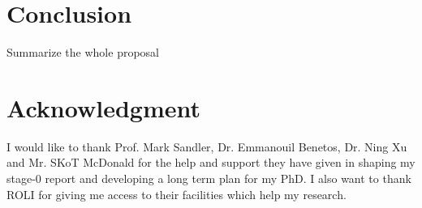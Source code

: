 \documentclass[journal,onecolumn]{IEEEtran}
\begin{document}




\section{Conclusion}
Summarize the whole proposal






%



\section*{Acknowledgment}
I would like to thank Prof. Mark Sandler, Dr. Emmanouil Benetos, Dr. Ning Xu and Mr. SKoT McDonald for the help and support they have given in shaping my stage-0 report and developing a long term plan for my PhD. I also want to thank ROLI for giving me access to their facilities which help my research.
\end{document}
